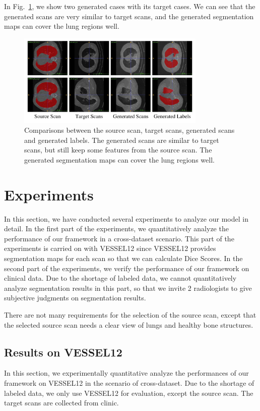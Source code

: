 \documentclass{article}
\begin{document}
In Fig.~\ref{generatedata}, we show two generated cases with its target cases. We can see that the generated scans are very similar to target scans, and the generated segmentation maps can cover the lung regions well.

\begin{figure}[htbp]
\centerline{\includegraphics[width=90mm]{generatedata.pdf}}
\vspace{-0.5cm}
\caption{Comparisons between the source scan, target scans, generated scans and generated labels. The generated scans are similar to target scans, but still keep some features from the source scan. The generated segmentation maps can cover the lung regions well.
}
\vspace{-0.3cm}
\label{generatedata}
\end{figure}

\section{Experiments}
\label{sec:experiments}
In this section, we have conducted several experiments to analyze our model in detail. 
In the first part of the experiments, we quantitatively analyze the performance of our framework in a cross-dataset scenario. This part of the experiments is carried on with VESSEL12 since VESSEL12 provides segmentation maps for each scan so that we can calculate Dice Scores.
In the second part of the experiments, we verify the performance of our framework on clinical data. 
Due to the shortage of labeled data, we cannot quantitatively analyze segmentation results in this part, so that we invite 2 radiologists to give subjective judgments on segmentation results.

There are not many requirements for the selection of the source scan, except that the selected source scan needs a clear view of lungs and healthy bone structures.

\subsection{Results on VESSEL12}
\label{subsec:vessel}
In this section, we experimentally quantitative analyze the performances of our framework on VESSEL12 in the scenario of cross-dataset. Due to the shortage of labeled data, we only use VESSEL12 for evaluation, except the source scan. The target scans are collected from clinic.
\end{document}
